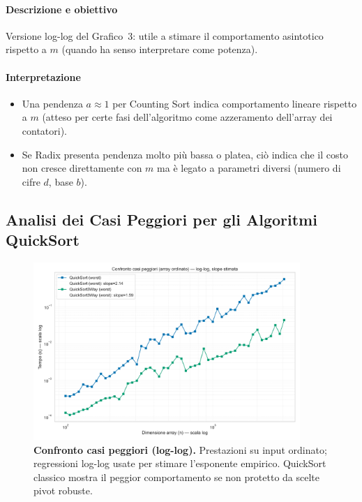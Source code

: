 \documentclass[a4paper, 11pt]{article}
\begin{document}
\paragraph{Descrizione e obiettivo}
Versione log-log del Grafico~3: utile a stimare il comportamento asintotico rispetto a \(m\) (quando ha senso interpretare come potenza).

\paragraph{Interpretazione}
\begin{itemize}
  \item Una pendenza \(a\approx 1\) per Counting Sort indica comportamento lineare rispetto a \(m\) (atteso per certe fasi dell'algoritmo come azzeramento dell'array dei contatori).
  \item Se Radix presenta pendenza molto più bassa o platea, ciò indica che il costo non cresce direttamente con \(m\) ma è legato a parametri diversi (numero di cifre \(d\), base \(b\)).
\end{itemize}

\subsection{Analisi dei Casi Peggiori per gli Algoritmi QuickSort}
\begin{figure}[H]
\centering
\includegraphics[width=0.9\textwidth]{./Immagini/confronto_casi_peggiori_loglog.png}
\caption*{\textbf{Confronto casi peggiori (log-log).} Prestazioni su input ordinato; regressioni log-log usate per stimare l'esponente empirico. QuickSort classico mostra il peggior comportamento se non protetto da scelte pivot robuste.}
\label{fig:confront_loglog}
\end{figure}
\end{document}
